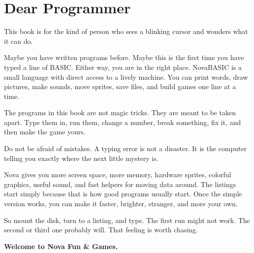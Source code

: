 \chapter*{Dear Programmer}
{}

This book is for the kind of person who sees a blinking cursor and wonders
what it can do.

Maybe you have written programs before. Maybe this is the first time you have
typed a line of BASIC. Either way, you are in the right place. NovaBASIC is a
small language with direct access to a lively machine. You can print words,
draw pictures, make sounds, move sprites, save files, and build games one line
at a time.

The programs in this book are not magic tricks. They are meant to be taken
apart. Type them in, run them, change a number, break something, fix it, and
then make the game yours.

\begin{typeinbox}[title=The Most Important Rule]
Do not be afraid of mistakes. A typing error is not a disaster. It is the
computer telling you exactly where the next little mystery is.
\end{typeinbox}

Nova gives you more screen space, more memory, hardware sprites, colorful
graphics, useful sound, and fast helpers for moving data around. The listings
start simply because that is how good programs usually start. Once the simple
version works, you can make it faster, brighter, stranger, and more your own.

So mount the disk, turn to a listing, and type. The first run might not work.
The second or third one probably will. That feeling is worth chasing.

\vspace{1.5em}
\noindent\textbf{Welcome to Nova Fun \& Games.}
